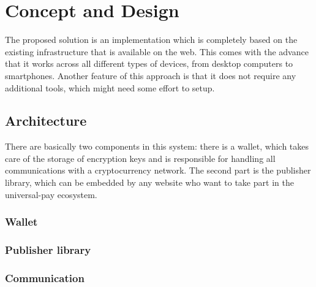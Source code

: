 \chapter{Concept and Design}
\label{cha:conceptanddesign}
The proposed solution is an implementation which is completely based on the existing infrastructure that is available on the web. This comes with the advance that it works across all different types of devices, from desktop computers to smartphones. Another feature of this approach is that it does not require any additional tools, which might need some effort to setup.

\section{Architecture}
There are basically two components in this system: there is a wallet, which takes care of the storage of encryption keys and is responsible for handling all communications with a cryptocurrency network. The second part is the publisher library, which can be embedded by any website who want to take part in the universal-pay ecosystem. 

\subsection{Wallet}

\subsection{Publisher library}

\subsection{Communication}
